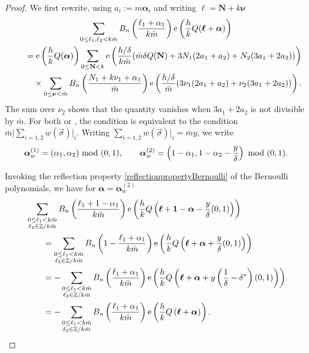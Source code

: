 \documentclass[10pt,a4paper]{amsart}
\newcommand{\ZZ}{\mathbb{Z}}
\def\bal{\boldsymbol{\alpha}}
\def\bol{\boldsymbol{\ell}}
\def\ex{{\rm e}}
\theoremstyle{definition}
\numberwithin{equation}{section}
\begin{document}
\begin{proof}
	We first rewrite, using $a_{i}:=m \bal_{i}$ and writing $\bol= \mathbf{N}+k\boldsymbol{\nu}$
	\begin{gather*}
		\sum_{0\leq \ell_1,\ell_2 < k\bar m}B_n\left( \frac{\ell_{1}+\alpha_{1}}{k\bar{m}} \right)\ex\left({\frac{h}{k}Q( \bol+\bal )}\right) \\
	\qquad	 =\ex\left(\frac{h}{k}Q( \bal )\right)\sum_{0\leq \mathbf{N}<k}
	\ex\left(\frac{{h/\delta}}{k\bar m}( \bar{m}\delta Q( \mathbf{N} )+3N_{1}( 2a_{1}+a_{2} )+N_{2}( 3a_{1}+2a_{2} ) )\right)
	\\
\phantom{\qquad	 =}{}	\times \sum_{0\leq \boldsymbol{\nu}<\bar{m}}B_{n}\left( \frac{N_{1}+k\nu_{1}+\alpha_{1}}{\bar{m}} \right)\ex\left(\frac{{h/\delta}}{\bar{m}}( 3\nu_{1}( 2a_{1}+a_{2} )+\nu_{2}( 3a_{1}+2a_{2} ) ) \right) .
\end{gather*}
The sum over $\nu_2$ shows that the quantity vanishes when $3a_{1}+2a_{2}$ is not divisible by $\bar m$. For both \smash{$\bal = \bal^{(1)}_w$} or \smash{$\bal = \bal^{(2)}_w$}, the condition is equivalent to the condition $\bar m\lvert \sum_{i=1,2} w(\vec \sigma)\lvert_i$. Writing $ \sum_{i=1,2} w(\vec \sigma)\lvert_i =\bar m y$, we write
	\begin{gather*}
	\bal_w^{(1)} = (\alpha_1,\alpha_2)~{\rm mod}~(0,1),\qquad
	\bal_w^{(2)} = \left(1-\alpha_1,1-\alpha_2-{\frac{y}{\delta}}\right)~{\rm mod}~(0,1).
\end{gather*}
	
Invoking the reflection property \eqref{reflectionpropertyBernoulli} of the Bernoulli polynomials, we have for $\bal = \bal_w^{(2)}$
	\begin{align*}
	& \sum_{\substack{0\leq \ell_1< k\bar m\\\ell_2\in \ZZ/k\bar m}} B_n\left( \frac{\ell_{1}+1-\alpha_{1}}{k\bar{m}} \right)
	\ex\left({\frac{h}{k}Q\left( \bol+{\bf 1}-\bal -\frac{y}{\delta}(0,1)\right)}\right)
	\\
 &\qquad =
	\sum_{\substack{0\leq \ell_1< k\bar m\\\ell_2\in \ZZ/k\bar m}}B_n\left(1- \frac{\ell_{1}+\alpha_{1}}{k\bar{m}} \right)\ex\left({\frac{h}{k}Q\left( \bol+\bal +\frac{y}{\delta}(0,1) \right)}\right) \\
 &\qquad= 	- \sum_{\substack{0\leq \ell_1< k\bar m\\\ell_2\in \ZZ/k\bar m}}B_n\left( \frac{\ell_{1}+\alpha_{1}}{k\bar{m}} \right)\ex\left({\frac{h}{k}Q\left( \bol+\bal +{y}\left(\frac{1}{\delta}-\delta^\ast\right)(0,1) \right)}\right) \\
 &\qquad	= - \sum_{\substack{0\leq \ell_1< k\bar m\\\ell_2\in \ZZ/k\bar m}}B_n\left( \frac{\ell_{1}+\alpha_{1}}{k\bar{m}} \right)\ex\left({\frac{h}{k}Q\left( \bol+\bal \right)}\right).
	\end{align*}
	

\end{proof}
\end{document}
